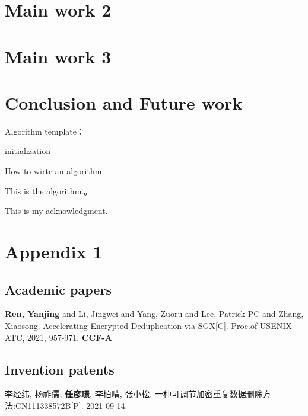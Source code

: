 \documentclass[doctor,english]{thesis-uestc}  %
\begin{document}
\chapter{Main work 2}
\chapter{Main work 3}
\chapter{Conclusion and Future work}

Algorithm template：

\begin{algorithm}[H]\label{alg:1}
    initialization\;
    \caption{How to wirte an algorithm.}
\end{algorithm}

This is the algorithm.。

\thesisacknowledgement

This is my acknowledgment. %


\thesisappendix
\chapter{Appendix 1} %

\begin{thesistheaccomplish}
    \section{Academic papers}
     \textbf{Ren, Yanjing} and Li, Jingwei and Yang, Zuoru and Lee, Patrick PC and Zhang, Xiaosong. Accelerating Encrypted Deduplication via SGX[C]. Proc.of USENIX ATC, 2021, 957-971. \textbf{CCF-A}
    \section{Invention patents}
     李经纬, 杨祚儒, \textbf{任彦璟}, 李柏晴, 张小松. 一种可调节加密重复数据删除方法:CN111338572B[P]. 2021-09-14.
\end{thesistheaccomplish}
\end{document}
